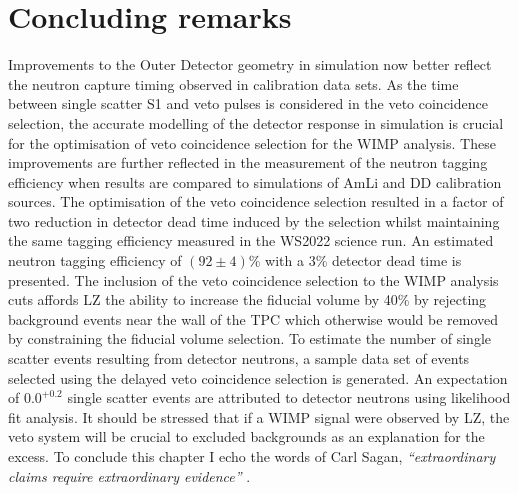 \section{Concluding remarks}
Improvements to the Outer Detector geometry in simulation now better reflect the neutron capture timing observed in calibration data sets. As the time between single scatter S1 and veto pulses is considered in the veto coincidence selection, the accurate modelling of the detector response in simulation is crucial for the optimisation of veto coincidence selection for the WIMP analysis. These improvements are further reflected in the measurement of the neutron tagging efficiency when results are compared to simulations of AmLi and DD calibration sources. The optimisation of the veto coincidence selection resulted in a factor of two reduction in detector dead time induced by the selection whilst maintaining the same tagging efficiency measured in the WS2022 science run. An estimated neutron tagging efficiency of $(92\pm4)\%$ with a 3\% detector dead time is presented. The inclusion of the veto coincidence selection to the WIMP analysis cuts affords LZ the ability to increase the fiducial volume by 40\% by rejecting background events near the wall of the TPC which otherwise would be removed by constraining the fiducial volume selection. To estimate the number of single scatter events resulting from detector neutrons, a sample data set of events selected using the delayed veto coincidence selection is generated. An expectation of $0.0^{+0.2}$ single scatter events are attributed to detector neutrons using likelihood fit analysis. It should be stressed that if a WIMP signal were observed by LZ, the veto system will be crucial to excluded backgrounds as an explanation for the excess. To conclude this chapter I echo the words of Carl Sagan, \textit{``extraordinary claims require extraordinary evidence''} \cite{SaganCarl:BrocasBrain}.